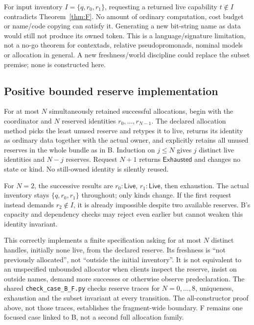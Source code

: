 For input inventory $I=\{q,r_0,r_1\}$, requesting a returned live
capability $t\notin I$ contradicts Theorem~\ref{thm:F}.
No amount of ordinary computation, cost budget or name/code copying can
satisfy it. Generating a new bit-string name as data would still not
produce its owned token. This is a language/signature limitation, not a
no-go theorem for contextads, relative pseudopromonads, nominal models or
allocation in general. A new freshness/world discipline could replace
the subset premise; none is constructed here.

\subsection{Positive bounded reserve implementation}
For at most $N$ simultaneously retained successful allocations, begin
with the coordinator and $N$ reserved identities $r_0,\ldots,r_{N-1}$.
The declared allocation method picks the least unused reserve and retypes
it to live, returns its identity as ordinary data together with the
actual owner, and explicitly retains all unused reserves in the whole
bundle as in B. Induction on $j\leq N$ gives $j$ distinct live identities
and $N-j$ reserves. Request $N+1$ returns $\mathsf{Exhausted}$ and changes
no state or kind. No still-owned identity is silently reused.

For $N=2$, the successive results are $r_0:\mathsf{Live}$,
$r_1:\mathsf{Live}$, then exhaustion. The actual inventory stays
$\{q,r_0,r_1\}$ throughout; only kinds change. If the first request
instead demands $r_2\notin I$, it is already impossible despite two
available reserves. B's capacity and dependency checks may reject even
earlier but cannot weaken this identity invariant.

This correctly implements a finite specification asking for at most
$N$ distinct handles, initially none live, from the declared reserve.
Its freshness is ``not previously allocated'', not ``outside the initial
inventory''. It is not equivalent to an unspecified unbounded allocator
when clients inspect the reserve, insist on outside names, demand more
successes or otherwise observe predeclaration. The shared
\texttt{check\_case\_B\_F.py} checks reserve traces for $N=0,\ldots,8$,
uniqueness, exhaustion and the subset invariant at every transition.
The all-constructor proof above, not those traces, establishes the
fragment-wide boundary. F remains one focused case linked to B, not a
second full allocation family.

